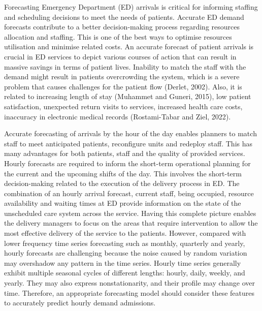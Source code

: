 \documentclass[]{elsarticle} %
\begin{document}
Forecasting Emergency Department (ED) arrivals is critical for informing
staffing and scheduling decisions to meet the needs of patients.
Accurate ED demand forecasts contribute to a better decision-making
process regarding resources allocation and staffing. This is one of the
best ways to optimise resources utilisation and minimise related costs.
An accurate forecast of patient arrivals is crucial in ED services to
depict various courses of action that can result in massive savings in
terms of patient lives. Inability to match the staff with the demand
might result in patients overcrowding the system, which is a severe
problem that causes challenges for the patient flow
(Derlet, 2002). Also, it is related to increasing length of
stay (Muhammet and Guneri, 2015), low patient satisfaction, unexpected
return visits to services, increased health care costs, inaccuracy in
electronic medical records (Rostami-Tabar and Ziel, 2022).

Accurate forecasting of arrivals by the hour of the day enables planners
to match staff to meet anticipated patients, reconfigure units and
redeploy staff. This has many advantages for both patients, staff and
the quality of provided services. Hourly forecasts are required to
inform the short-term operational planning for the current and the
upcoming shifts of the day. This involves the short-term decision-making
related to the execution of the delivery process in ED. The combination
of an hourly arrival forecast, current staff, being occupied, resource
availability and waiting times at ED provide information on the state of
the unscheduled care system across the service. Having this complete
picture enables the delivery managers to focus on the areas that require
intervention to allow the most effective delivery of the service to the
patients. However, compared with lower frequency time series forecasting
such as monthly, quarterly and yearly, hourly forecasts are challenging
because the noise caused by random variation may overshadow any pattern
in the time series. Hourly time series generally exhibit multiple
seasonal cycles of different lengths: hourly, daily, weekly, and yearly.
They may also express nonstationarity, and their profile may change over
time. Therefore, an appropriate forecasting model should consider these
features to accurately predict hourly demand admissions.
\end{document}
